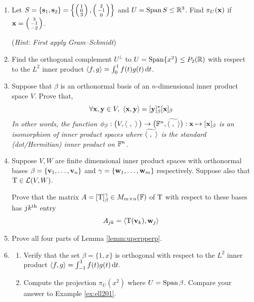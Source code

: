 \begin{exercises}{}{}
\begin{enumerate}
	  \textbf{Important!} You will likely need \emph{much} more practice than this to get comfortable with Gram--Schmidt. Make up your own problems: start by changing the numbers in part (a)\ldots
	  
	  
	  \item Let $S=\{{\mathbf{s}}_1,{\mathbf{s}}_2\}=\left\{\left(\begin{smallmatrix}1\\0\\3\end{smallmatrix}\right),\left(\begin{smallmatrix}2\\-1\\0\end{smallmatrix}\right)\right\}$ and $U=\operatorname{Span} S\le\mathbb{R}^3$. Find $\pi_U({\mathbf{x}})$ if ${\mathbf{x}}=\left(\begin{smallmatrix}3\\-1\\-2\end{smallmatrix}\right)$.\par
	  (\emph{Hint: First apply Gram--Schmidt})
	 	
	 	
	 	\item Find the orthogonal complement $U^\perp$ to $U=\operatorname{Span}\{x^2\}\le P_2(\mathbb{R})$ with respect to the $L^2$ inner product $\left\langle f,g\right\rangle=\int_0^1 f(t)g(t)\,{\mathrm{d} t}$.
	 	 
	  
	  \item Suppose that $\beta$ is an orthonormal basis of an $n$-dimensional inner product space $V$. Prove that,
		\[
			\forall\vx,\vy\in V,\ \ip{\vx,\vy}=[\vy]_\beta^*[\vx]_\beta
		\]
		\emph{In other words, the function $\phi_\beta:\big(V,\left\langle \ ,\ \right\rangle\big)\to \big(\mathbb{F}^n,\widetilde{\left\langle \ ,\ \right\rangle}\big):{\mathbf{x}}\mapsto [{\mathbf{x}}]_\beta$ is an isomorphism of inner product spaces where $\widetilde{\left\langle \ ,\ \right\rangle}$ is the standard (dot/Hermitian) inner product on $\mathbb{F}^n$.}
		
		
		\pagebreak[3]
	    
	    
	  \item\label{exs:fdipsmatrix} Suppose $V,W$ are finite dimensional inner product spaces with orthonormal bases $\beta=\{{\mathbf{{\mathbf{v}}}}_1,\ldots,{\mathbf{{\mathbf{v}}}}_{n}\}$ and $\gamma=\{{\mathbf{w}}_1,\ldots,{\mathbf{w}}_{m}\}$ respectively. Suppose also that $\mathrm{T}\in\mathcal{L}(V,W)$.\par
	  Prove that the matrix $A=[\mathrm{T}]_\beta^\gamma \in M_{m\times n}(\mathbb{F})$ of $\mathrm{T}$ with respect to these bases has $jk\textsuperscript{th}$ entry
	  \[
	  	A_{jk}=\left\langle \mathrm{T}({\mathbf{v}}_k),{\mathbf{w}}_j\right\rangle
	  \]

	 	
	  \item\label{exs:uperpperp} Prove all four parts of Lemma \ref{lemm:uperpperp}.
	  
	  
	  \item\begin{enumerate}
	    \item Verify that the set $\beta=\{1,x\}$ is orthogonal with respect to the $L^2$ inner product $\left\langle f,g\right\rangle=\int_{-1}^1f(t)g(t)\,{\mathrm{d} t}$.
	    \item Compute the projection $\pi_U(x^2)$ where $U=\operatorname{Span}\beta$. Compare your answer to Example \ref{ex:ell201}.
	  \end{enumerate}
	  

\end{enumerate}
\end{exercises}
